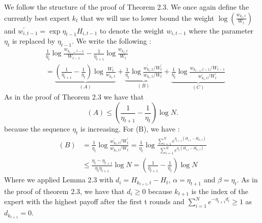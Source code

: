 \begin{solution}[]
	We follow the structure of the proof of Theorem 2.3. We once again define the currently best expert $ k_t $ that we will use to lower bound the weight $ \log(\frac{w_{k_t,t}}{W_t}) $ and $ w^{'}_{i,t-1} = \exp{\eta_{t-1}H_{i,t-1}} $ to denote the weight $ w_{i,t-1} $ where the parameter $ \eta_t $ is replaced by $ \eta_{t-1} $. We write the following :
\begin{align*}
	&\frac{1}{\eta_t} \log \frac{w_{k_{t-1},t-1}}{W_{t-1}} - \frac{1}{\eta_{t+1}}\log \frac{w_{k_t,t}}{W_t} \\
	&= \underbrace{\left( \frac{1}{\eta_{t+1}} - \frac{1}{\eta_t} \right) \log \frac{W_t}{w_{k_t,t}}}_{(A)} + \underbrace{\frac{1}{\eta_t}\log \frac{w^{'}_{k_t,t}/W^{'}_t}{w_{k_t,t}/W_t}}_{(B)} + \underbrace{\frac{1}{\eta_t}\log \frac{w_{k_{t-1},t-1}/W_{t-1}}{w^{'}_{k_t,t}/W^{'}_t}}_{(C)}
\end{align*}
As in the proof of Theorem 2.3 we have that 
\begin{equation*}
	(A) \leq \left( \frac{1}{\eta_{t+1}}-\frac{1}{\eta_t} \right)\log N.
\end{equation*}
because the sequence $ \eta_t $ is increasing.
For (B), we have :
\begin{align*}
	(B) &= \frac{1}{\eta_t} \log \frac{w^{'}_{k_t,t}/W^{'}_t}{w_{k_t,t}/W_t} = \frac{1}{\eta_t}\log \frac{\sum_{i=1}^{N}e^{\eta_{t+1}(H_{i,t}-H_{k_t,t})}}{\sum_{i=1}^{N} e^{\eta_t (H_{i,t}-H_{k_t,t})}} \\
	    & \leq \frac{\eta_t - \eta_{t+1}}{\eta_t \eta_{t+1}}\log N = \left( \frac{1}{\eta_{t+1}} - \frac{1}{\eta_t} \right) \log N
\end{align*}
Where we applied Lemma 2.3 with $ d_i = H_{k_{t+1},t} - H_t$, $ \alpha = \eta_{t+1} $ and $ \beta = \eta_t $. As in the proof of theorem 2.3, we have that $ d_i \geq 0$ because $k_{t+1} $ is the index of the expert with the highest payoff after the first t rounds and $ \sum_{i=1}^{N}e^{-\eta_{t+1}d_i} \geq 1 $ as $ d_{k_{t+1}} =0 $. 


\end{solution}
